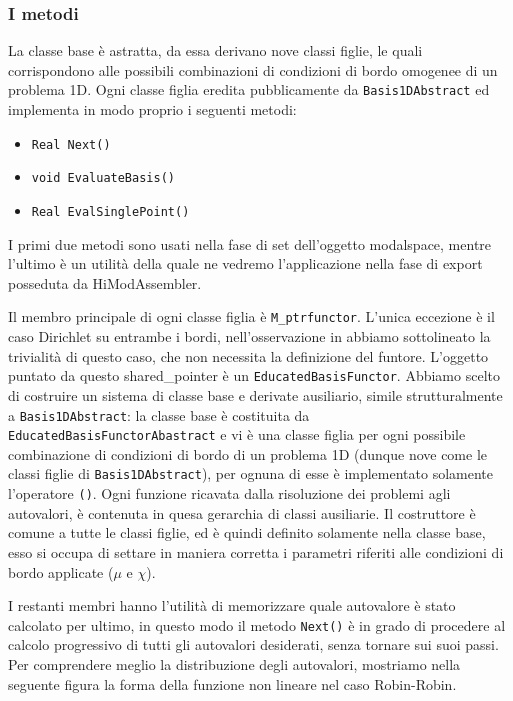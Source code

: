 \subsubsection{I metodi}

La classe base \`e astratta, da essa derivano nove classi figlie, le quali corrispondono alle possibili combinazioni di condizioni di bordo omogenee di un problema 1D. Ogni classe figlia eredita pubblicamente da \texttt{Basis1DAbstract} ed implementa in modo proprio i seguenti metodi:

\begin{itemize}
\item \texttt{Real Next()} 
\item \texttt{void EvaluateBasis()}
\item \texttt{Real EvalSinglePoint()}
\end{itemize}

I primi due metodi sono usati nella fase di set dell'oggetto modalspace, mentre l'ultimo \`e un utilit\`a della quale ne vedremo l'applicazione nella fase di export posseduta da HiModAssembler. 

Il membro principale di ogni classe figlia \`e \texttt{M\_ptrfunctor}. 
L'unica eccezione \`e il caso Dirichlet su entrambe i bordi, nell'osservazione in  abbiamo sottolineato la trivialit\`a di questo caso, che non necessita la definizione del funtore.
L'oggetto puntato da questo shared\_pointer  \`e un \texttt{EducatedBasisFunctor}. Abbiamo scelto di costruire un sistema di classe base e derivate ausiliario, simile strutturalmente a \texttt{Basis1DAbstract}: la classe base \`e costituita da \texttt{EducatedBasisFunctorAbastract} e vi \`e una classe figlia per ogni possibile combinazione di condizioni di bordo di un problema 1D (dunque nove come le classi figlie di \texttt{Basis1DAbstract}), per ognuna di esse \`e implementato solamente l'operatore \texttt{()}. Ogni funzione ricavata dalla risoluzione dei problemi agli autovalori, \`e contenuta in quesa gerarchia di classi ausiliarie. Il costruttore \`e comune a tutte le classi figlie, ed \`e quindi definito solamente nella classe base, esso si occupa di settare in maniera corretta i parametri riferiti alle condizioni di bordo applicate ($\mu$ e $\chi$). 


I restanti membri hanno l'utilit\`a di memorizzare quale autovalore \`e stato calcolato per ultimo, in questo modo il metodo \texttt{Next()} \`e in grado di procedere al calcolo progressivo di tutti gli autovalori desiderati, senza tornare sui suoi passi. Per comprendere meglio la distribuzione degli autovalori, mostriamo nella seguente figura la forma della funzione non lineare nel caso Robin-Robin.

